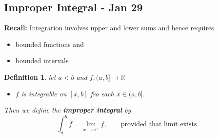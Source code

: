 \documentclass[12pt]{article}
\theoremstyle{plain}
\newtheorem{definition}{Definition}[subsection]
\newcommand{\mR}{{\mathbb{R}}}
\begin{document}
	\newpage
	\subsection{Improper Integral - Jan 29}
	\textbf{Recall: }Integration involves upper and lower sums and hence
	requires 
	\begin{itemize}
		\item bounded functions and 
		\item bounded intervals
	\end{itemize}

	\begin{definition}
		let $a<b$ and $f:(a,b]\to \mR$
		\begin{itemize}
			\item $f$ is integrable on $[x,b]$ fro each $x\in (a,b]$. 
		\end{itemize}
		Then we define the \textbf{improper integral} by 
		\[
			\int_a^b f = \lim_{x\to a^+} f, \qquad \text{provided that
			limit exists}
		\]
	\end{definition}
\end{document}
